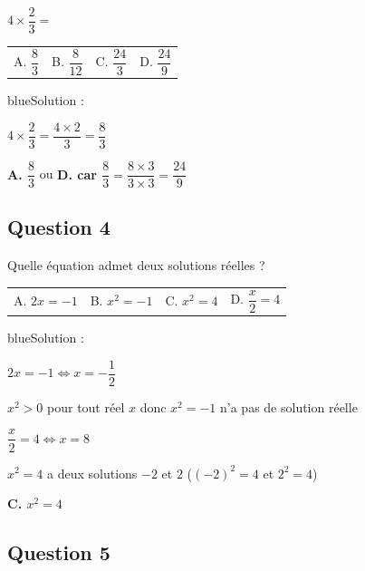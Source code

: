 $4\times\dfrac{2}{3}=$
\begin{center}
\begin{tabularx}{.92\linewidth}{XXXX} A. $\dfrac{8}{3}$ & B. $\dfrac{8}{12}$ & C. $\dfrac{24}{3}$ & D. $\dfrac{24}{9}$\end{tabularx}
\end{center}

\begin{color}{blue}Solution :\par
$4\times\dfrac{2}{3} = \dfrac{4\times 2}{3} = \dfrac{8}{3}$

\textbf{A. $\dfrac{8}{3}$} ou \textbf{D. car $\dfrac{8}{3} = \dfrac{8\times 3}{3\times 3} = \dfrac{24}{9}$}
\end{color}

\subsection*{Question 4}

Quelle équation admet deux solutions réelles ?
\begin{center}
\begin{tabularx}{.92\linewidth}{XXXX} A. $2x=-1$ & B. $x^2=-1$ & C. $x^2=4$ & D. $\dfrac{x}{2}=4$\end{tabularx}
\end{center}

\begin{color}{blue}Solution :\par
$2x=-1 \iff x=-\dfrac{1}{2}$

$x^2>0$ pour tout réel $x$ donc $x^2=-1$ n'a pas de solution réelle

$\dfrac{x}{2}=4\iff x=8$

$x^2=4$ a deux solutions $-2$ et $2$ ($(-2)^2 = 4$ et $2^2 = 4$)

\textbf{C. $x^2=4$}
\end{color}


\subsection*{Question 5}

\begin{center}
\end{center}

